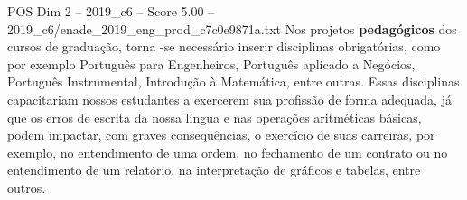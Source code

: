 \begin{textsample}{POS Dim 2 – 2019\_c6 – Score 5.00 – 2019\_c6/enade\_2019\_eng\_prod\_c7c0e9871a.txt}
Nos projetos \textbf{pedagógicos} dos cursos de graduação, torna -se necessário inserir disciplinas obrigatórias, como por exemplo Português para Engenheiros, Português aplicado a Negócios, Português Instrumental, Introdução à Matemática, entre outras.
Essas disciplinas capacitariam nossos estudantes a exercerem sua profissão de forma adequada, já que os erros de escrita da nossa língua e nas operações aritméticas básicas, podem impactar, com graves consequências, o exercício de suas carreiras, por exemplo, no entendimento de uma ordem, no fechamento de um contrato ou no entendimento de um relatório, na interpretação de gráficos e tabelas, entre outros.

\end{textsample}
